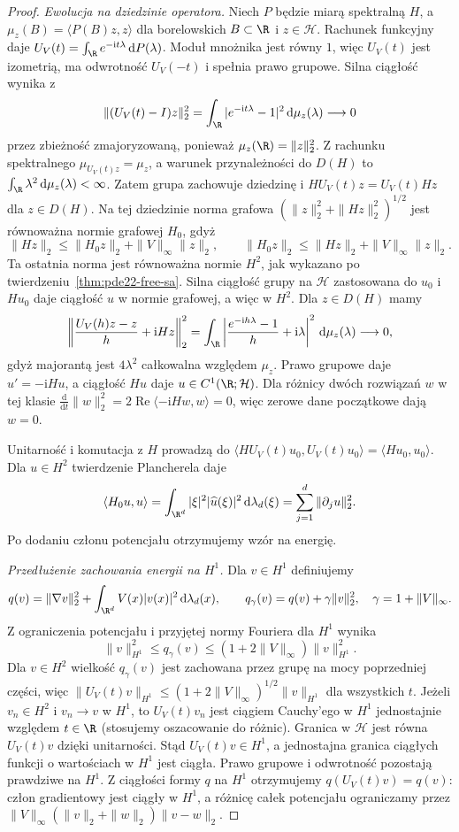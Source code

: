 \begin{proof}
\emph{Ewolucja na dziedzinie operatora.}
Niech $P$ będzie miarą spektralną $H$, a
$\mu_z(B)=\langle P(B)z,z\rangle$ dla borelowskich
$B\subset\R$ i $z\in\mathcal H$.
Rachunek funkcyjny daje
$U_V(t)=\int_{\R}e^{-\mathrm it\lambda}\,\mathrm dP(\lambda)$.
Moduł mnożnika jest równy $1$, więc $U_V(t)$ jest
izometrią, ma odwrotność $U_V(-t)$ i spełnia prawo
grupowe. Silna ciągłość wynika z
\[
 \|(U_V(t)-I)z\|_2^2
 =\int_\R|e^{-\mathrm it\lambda}-1|^2\,\mathrm d\mu_z(\lambda)
 \longrightarrow0
\]
przez zbieżność zmajoryzowaną, ponieważ
$\mu_z(\R)=\|z\|_2^2$.
Z rachunku spektralnego
$\mu_{U_V(t)z}=\mu_z$, a warunek przynależności do
$D(H)$ to $\int_\R\lambda^2\,\mathrm d\mu_z(\lambda)<\infty$.
Zatem grupa zachowuje dziedzinę i
$HU_V(t)z=U_V(t)Hz$ dla $z\in D(H)$.
Na tej dziedzinie norma grafowa
$(\|z\|_2^2+\|Hz\|_2^2)^{1/2}$ jest równoważna
normie grafowej $H_0$, gdyż
\[
 \|Hz\|_2\le\|H_0z\|_2+\|V\|_\infty\|z\|_2,
 \qquad
 \|H_0z\|_2\le\|Hz\|_2+\|V\|_\infty\|z\|_2.
\]
Ta ostatnia norma jest równoważna normie $H^2$,
jak wykazano po twierdzeniu~\ref{thm:pde22-free-sa}.
Silna ciągłość grupy na $\mathcal H$ zastosowana
do $u_0$ i $Hu_0$ daje ciągłość $u$ w normie
grafowej, a więc w $H^2$.
Dla $z\in D(H)$ mamy
\[
 \left\|\frac{U_V(h)z-z}{h}+\mathrm iHz\right\|_2^2
 =\int_\R\left|\frac{e^{-\mathrm ih\lambda}-1}{h}
                     +\mathrm i\lambda\right|^2\,\mathrm d\mu_z(\lambda)
 \longrightarrow0,
\]
gdyż majorantą jest $4\lambda^2$ całkowalna
względem $\mu_z$. Prawo grupowe daje
$u'=-\mathrm iHu$, a ciągłość $Hu$ daje $u\in C^1(\R;\mathcal H)$.
Dla różnicy dwóch rozwiązań $w$ w tej klasie
$\frac{\mathrm d}{\mathrm dt}\|w\|_2^2
=2\operatorname{Re}\langle-\mathrm iHw,w\rangle=0$,
więc zerowe dane początkowe dają $w=0$.

Unitarność i komutacja z $H$ prowadzą do
$\langle HU_V(t)u_0,U_V(t)u_0\rangle=
\langle Hu_0,u_0\rangle$.
Dla $u\in H^2$ twierdzenie Plancherela daje
\[
 \langle H_0u,u\rangle
 =\int_{\R^d}|\xi|^2|\widehat u(\xi)|^2\,\mathrm d\lambda_d(\xi)
 =\sum_{j=1}^d\|\partial_j u\|_2^2 .
\]
Po dodaniu członu potencjału otrzymujemy wzór na energię.

\emph{Przedłużenie zachowania energii na $H^1$.}
Dla $v\in H^1$ definiujemy
\[
 q(v)=\|\nabla v\|_2^2+
 \int_{\R^d}V(x)|v(x)|^2\,\mathrm d\lambda_d(x),
 \qquad
 q_\gamma(v)=q(v)+\gamma\|v\|_2^2,\quad
 \gamma=1+\|V\|_\infty.
\]
Z ograniczenia potencjału i przyjętej normy Fouriera
dla $H^1$ wynika
\[
 \|v\|_{H^1}^2\le q_\gamma(v)
 \le(1+2\|V\|_\infty)\|v\|_{H^1}^2 .
\]
Dla $v\in H^2$ wielkość $q_\gamma(v)$ jest
zachowana przez grupę na mocy poprzedniej części,
więc $\|U_V(t)v\|_{H^1}\le
(1+2\|V\|_\infty)^{1/2}\|v\|_{H^1}$ dla wszystkich $t$.
Jeżeli $v_n\in H^2$ i $v_n\to v$ w $H^1$,
to $U_V(t)v_n$ jest ciągiem Cauchy'ego w $H^1$
jednostajnie względem $t\in\R$ (stosujemy oszacowanie
do różnic). Granica w $\mathcal H$ jest równa
$U_V(t)v$ dzięki unitarności. Stąd $U_V(t)v\in H^1$,
a jednostajna granica ciągłych funkcji o wartościach
w $H^1$ jest ciągła. Prawo grupowe i odwrotność
pozostają prawdziwe na $H^1$.
Z ciągłości formy $q$ na $H^1$ otrzymujemy
$q(U_V(t)v)=q(v)$: człon gradientowy jest ciągły
w $H^1$, a różnicę całek potencjału ograniczamy
przez $\|V\|_\infty(\|v\|_2+\|w\|_2)\|v-w\|_2$.
\end{proof}

